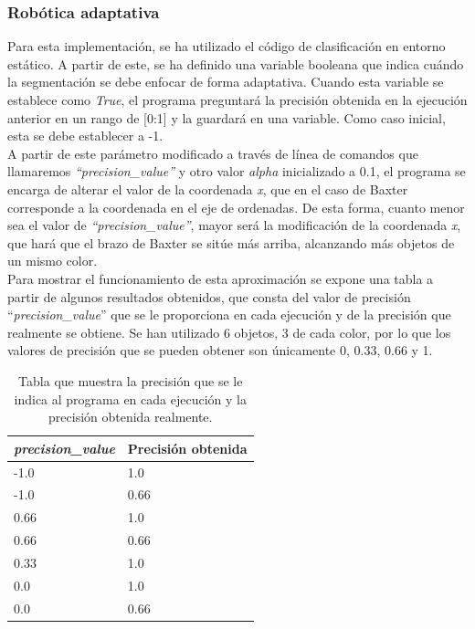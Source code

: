 \subsubsection{Robótica adaptativa}
\noindent Para esta implementación, se ha utilizado el código de clasificación en entorno estático. A partir de este, se ha definido una variable booleana que indica cuándo la segmentación se debe enfocar de forma adaptativa. Cuando esta variable se establece como \textit{True}, el programa preguntará la precisión obtenida en la ejecución anterior en un rango de [0:1] y la guardará en una variable. Como caso inicial, esta se debe establecer a -1. \\

\noindent A partir de este parámetro modificado a través de línea de comandos que llamaremos \textit{``precision\_value''} y otro valor \textit{alpha} inicializado a 0.1, el programa se encarga de alterar el valor de la coordenada \textit{x}, que en el caso de Baxter corresponde a la coordenada en el eje de ordenadas. De esta forma, cuanto menor sea el valor de \textit{``precision\_value''}, mayor será la modificación de la coordenada \textit{x}, que hará que el brazo de Baxter se sitúe más arriba, alcanzando más objetos de un mismo color. \\

\noindent Para mostrar el funcionamiento de esta aproximación se expone una tabla a partir de algunos resultados obtenidos, que consta del valor de precisión ``\textit{precision\_value}'' que se le proporciona en cada ejecución y de la precisión que realmente se obtiene. Se han utilizado 6 objetos, 3 de cada color, por lo que los valores de precisión que se pueden obtener son únicamente 0, 0.33, 0.66 y 1.

\begin{table}[H]
	\centering
	\begin{tabular}{|p{4cm} | p{4cm} |}
		\hline
		\textbf{\textit{precision\_value}} & \textbf{Precisión obtenida} \\ 
		\hline
		-1.0 & 1.0 \\
		\hline
		-1.0 & 0.66 \\
		\hline
		0.66 & 1.0 \\
		\hline
		0.66 & 0.66 \\
		\hline
		0.33 & 1.0 \\
		\hline
		0.0 & 1.0 \\
		\hline
		0.0 & 0.66 \\
		\hline
	\end{tabular}
	\caption{Tabla que muestra la precisión que se le indica al programa en cada ejecución y la precisión obtenida realmente.}
	\label{cuad:radap}
\end{table}


